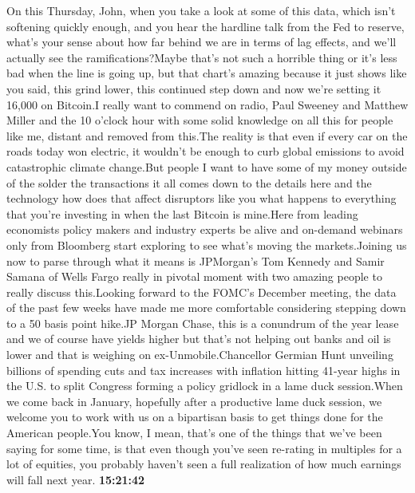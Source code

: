 \documentclass{article}%
\begin{document}
On this Thursday, John, when you take a look at some of this data, which isn't softening quickly enough, and you hear the hardline talk from the Fed to reserve, what's your sense about how far behind we are in terms of lag effects, and we'll actually see the ramifications?Maybe that's not such a horrible thing or it's less bad when the line is going up, but that chart's amazing because it just shows like you said, this grind lower, this continued step down and now we're setting it 16,000 on Bitcoin.I really want to commend on radio, Paul Sweeney and Matthew Miller and the 10 o'clock hour with some solid knowledge on all this for people like me, distant and removed from this.The reality is that even if every car on the roads today won electric, it wouldn't be enough to curb global emissions to avoid catastrophic climate change.But people I want to have some of my money outside of the solder the transactions it all comes down to the details here and the technology how does that affect disruptors like you what happens to everything that you're investing in when the last Bitcoin is mine.Here from leading economists policy makers and industry experts be alive and on{-}demand webinars only from Bloomberg start exploring to see what's moving the markets.Joining us now to parse through what it means is JPMorgan's Tom Kennedy and Samir Samana of Wells Fargo really in pivotal moment with two amazing people to really discuss this.Looking forward to the FOMC's December meeting, the data of the past few weeks have made me more comfortable considering stepping down to a 50 basis point hike.JP Morgan Chase, this is a conundrum of the year lease and we of course have yields higher but that's not helping out banks and oil is lower and that is weighing on ex{-}Unmobile.Chancellor Germian Hunt unveiling billions of spending cuts and tax increases with inflation hitting 41{-}year highs in the U.S. to split Congress forming a policy gridlock in a lame duck session.When we come back in January, hopefully after a productive lame duck session, we welcome you to work with us on a bipartisan basis to get things done for the American people.You know, I mean, that's one of the things that we've been saying for some time, is that even though you've seen re{-}rating in multiples for a lot of equities, you probably haven't seen a full realization of how much earnings will fall next year.%
\textbf{15:21:42}%
\newline%
\end{document}
